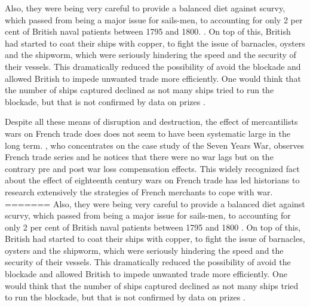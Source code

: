 \documentclass[12pt,a4paper,notitlepage,english]{article}
\begin{document}
Also, they were being very careful to provide a balanced diet against scurvy, which passed from being a major issue for sails-men, to accounting for only 2 per cent of British naval patients between 1795 and 1800.
\citep{Rodger2005}.
On top of this, British had started to coat their ships with copper, to fight the issue of barnacles, oysters and the shipworm, which were seriously hindering the speed and the security of their vessels.
This dramatically reduced the possibility of avoid the blockade and allowed British to impede unwanted trade more efficiently.
One would think that the number of ships captured declined as not many ships tried to run the blockade, but that is not confirmed by data on prizes \cite{Benjamin2009}.

Despite all these means of disruption and destruction, the effect of mercantilists wars on French trade does does not seem to have been systematic large in the long term.
\cite{Riley1986}, who concentrates on the case study of the Seven Years War, observes French trade series and he notices that there were no war lags but on the contrary pre and post war loss compensation effects.
This widely recognized fact about the effect of eighteenth century wars on French trade has led historians to research extensively the strategies of French merchants to cope with war.
=======
Also, they were being very careful to provide a balanced diet against scurvy, which passed from being a major issue for sails-men, to accounting for only 2 per cent of British naval patients between 1795 and 1800 \citep{Rodger2005}.
On top of this, British had started to coat their ships with copper, to fight the issue of barnacles, oysters and the shipworm, which were seriously hindering the speed and the security of their vessels.
This dramatically reduced the possibility of avoid the blockade and allowed British to impede unwanted trade more efficiently.
One would think that the number of ships captured declined as not many ships tried to run the blockade, but that is not confirmed by data on prizes \citep{Benjamin2009}.
\end{document}
